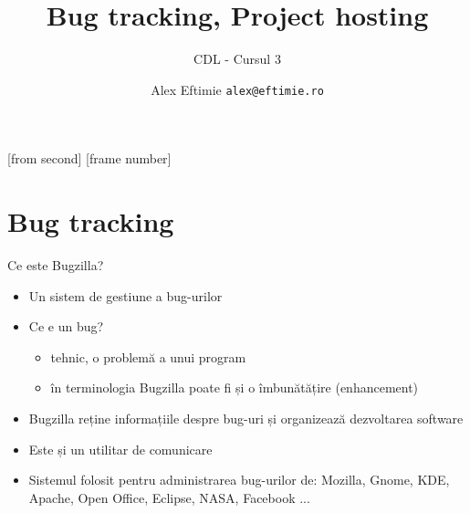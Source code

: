 \documentclass{beamer}
\title[BugzillaLaunchpad]{Bug tracking, Project hosting} %
\subtitle{CDL - Cursul 3}
\institute{ROSEdu}
\author{Alex Eftimie \texttt{alex@eftimie.ro}}
\begin{document}
[from second]
[frame number]

\frame{\titlepage}

\frame{\tableofcontents}

\section{Bug tracking}

\frame{\tableofcontents[currentsection]}

\begin{frame}{Ce este Bugzilla?}
\begin{itemize} %
\item Un sistem de gestiune a bug-urilor
\pause \item Ce e un bug?
\begin{itemize}
\pause \item tehnic, o problemă a unui program
\pause \item în terminologia Bugzilla poate fi și o îmbunătățire (enhancement)
\end{itemize}
\pause \item Bugzilla reține informațiile despre bug-uri și organizează dezvoltarea software
\pause \item Este și un utilitar de comunicare
\pause \item Sistemul folosit pentru administrarea bug-urilor de: Mozilla, Gnome, KDE, Apache, Open Office, Eclipse, NASA, Facebook ...
\end{itemize}
\end{frame}
\end{document}
